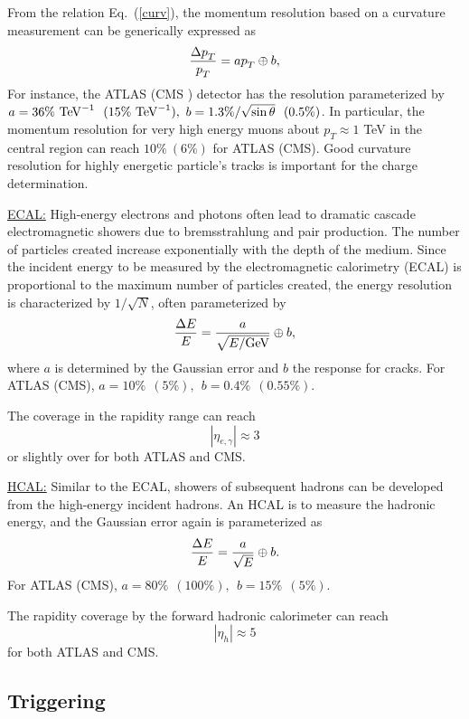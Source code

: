 \documentclass[prd,aps,floats,preprintnumbers,preprint,superscriptaddress,floatfix,nofootinbib]{revtex4}
\def\pt{p_T^{}}
\def\gev{{\rm GeV}}
\def\tev{{\rm TeV}}
\def\be{\begin{equation}}
\def\ee{\end{equation}}
\begin{document}
From the relation Eq.~(\ref{curv}), the momentum resolution based on a
curvature measurement can be generically expressed as
\be
{\Delta \pt \over \pt} = {a \pt} \oplus {b},
\ee
For instance, the ATLAS \cite{ATLAS} (CMS \cite{CMS}) detector 
has the resolution 
parameterized by $a=36\%\ \tev^{-1}\ \ (15\%\ \tev^{-1}),\ 
b=1.3\%/\sqrt{\sin\theta}\ \ (0.5\%)$. In particular, the momentum resolution
for very high energy muons about $\pt \approx 1$ TeV in the central region 
can reach $10\%\ (6\%)$ for ATLAS (CMS). Good curvature 
resolution for highly energetic particle's tracks is important for the 
charge determination.

\vskip 0.3cm
\noindent
\underline{ECAL:} High-energy electrons and photons often lead to
dramatic cascade electromagnetic showers due to bremsstrahlung and
pair production.  The number of particles created increase exponentially
with the depth of the medium.  Since the incident energy to be measured 
by the electromagnetic calorimetry (ECAL) is
proportional to the maximum number of particles created, the energy resolution
is characterized by $1/\sqrt N$, often parameterized by
\be
{\Delta E\over E} = {a\over \sqrt{E/ \gev}} \oplus {b},
\ee
where $a$ is determined by the Gaussian error and $b$ the response
for cracks.
For ATLAS (CMS), $a=10\%\ \ (5\%),\ \ b=0.4\%\ \ (0.55\%)$.

The coverage in the rapidity range can  reach
\be
|\eta_{e,\gamma}|\approx 3
\ee
or slightly over for both ATLAS and CMS.

\vskip 0.3cm
\noindent
\underline{HCAL:} 
Similar to the ECAL, showers of subsequent hadrons  can be developed
from the high-energy incident hadrons. An HCAL is to measure the hadronic
energy, and the Gaussian error again is parameterized as
\be
{\Delta E\over E} = {a\over \sqrt E} \oplus {b}.
\ee
For ATLAS (CMS), $a=80\%\ \ (100\%),\ \ b=15\%\ \ (5\%)$.

The rapidity coverage by the forward hadronic calorimeter can  reach
\be
|\eta_h|\approx 5
\ee
for both ATLAS and CMS.



\vskip 0.2cm
\noindent
\subsection{Triggering}
\end{document}
